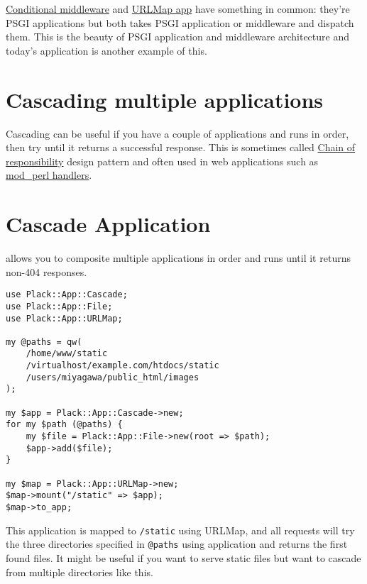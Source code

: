 \href{http://advent.plackperl.org/2009/12/day-18-load-middleware-conditionally.html}{Conditional
middleware} and
\href{http://advent.plackperl.org/2009/12/day-12-maps-multiple-apps-with-mount-and-urlmap.html}{URLMap
app} have something in common: they're PSGI applications but both takes
PSGI application or middleware and dispatch them. This is the beauty of
PSGI application and middleware architecture and today's application is
another example of this.

\section{Cascading multiple
applications}\label{cascading-multiple-applications}

Cascading can be useful if you have a couple of applications and runs in
order, then try until it returns a successful response. This is
sometimes called
\href{http://en.wikipedia.org/wiki/Chain-of-responsibility_pattern}{Chain
of responsibility} design pattern and often used in web applications
such as
\href{http://perl.apache.org/docs/2.0/user/handlers/intro.html}{mod\_perl
handlers}.

\section{Cascade Application}\label{cascade-application}

 allows you to composite multiple applications in
order and runs until it returns non-404 responses.

\begin{lstlisting}
use Plack::App::Cascade;
use Plack::App::File;
use Plack::App::URLMap;

my @paths = qw(
    /home/www/static
    /virtualhost/example.com/htdocs/static
    /users/miyagawa/public_html/images
);

my $app = Plack::App::Cascade->new;
for my $path (@paths) {
    my $file = Plack::App::File->new(root => $path);
    $app->add($file);
}

my $map = Plack::App::URLMap->new;
$map->mount("/static" => $app);
$map->to_app;
\end{lstlisting}

This application is mapped to \lstinline!/static! using URLMap, and all
requests will try the three directories specified in \lstinline!@paths!
using  application and returns the first found files. It might
be useful if you want to serve static files but want to cascade from
multiple directories like this.

